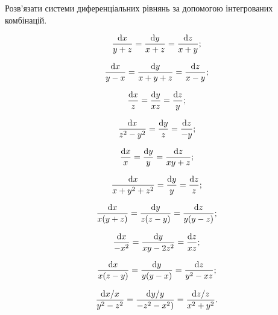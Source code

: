 Розв’язати системи диференціальних рівнянь за допомогою інтегрованих комбінацій.

\begin{multicols}{2}
\begin{problem}
	\[ \frac{\mathop{}\!\mathrm{d} x}{y + z} = \frac{\mathop{}\!\mathrm{d} y}{x + z} = \frac{\mathop{}\!\mathrm{d} z}{x + y}; \]
\end{problem}
\begin{problem}
	\[ \frac{\mathop{}\!\mathrm{d} x}{y - x} = \frac{\mathop{}\!\mathrm{d} y}{x + y + z} = \frac{\mathop{}\!\mathrm{d} z}{x - y}; \]
\end{problem}
\begin{problem}
	\[ \frac{\mathop{}\!\mathrm{d} x}{z} = \frac{\mathop{}\!\mathrm{d} y}{x z} = \frac{\mathop{}\!\mathrm{d} z}{y}; \]
\end{problem}
\begin{problem}
	\[ \frac{\mathop{}\!\mathrm{d} x}{z^2 - y^2} = \frac{\mathop{}\!\mathrm{d} y}{z} = \frac{\mathop{}\!\mathrm{d} z}{- y}; \]
\end{problem}
\begin{problem}
	\[ \frac{\mathop{}\!\mathrm{d} x}{x} = \frac{\mathop{}\!\mathrm{d} y}{y} = \frac{\mathop{}\!\mathrm{d} z}{x y + z}; \]
\end{problem}
\begin{problem}
	\[ \frac{\mathop{}\!\mathrm{d} x}{x + y^2 + z^2} = \frac{\mathop{}\!\mathrm{d} y}{y} = \frac{\mathop{}\!\mathrm{d} z}{z}; \]
\end{problem}
\begin{problem}
	\[ \frac{\mathop{}\!\mathrm{d} x}{x (y + z)} = \frac{\mathop{}\!\mathrm{d} y}{z (z - y)} = \frac{\mathop{}\!\mathrm{d} z}{y  (y - z)}; \]
\end{problem}
\begin{problem}
	\[ \frac{\mathop{}\!\mathrm{d} x}{-x^2} = \frac{\mathop{}\!\mathrm{d} y}{x y - 2 z^2} = \frac{\mathop{}\!\mathrm{d} z}{x z}; \]
\end{problem}
\begin{problem}
	\[ \frac{\mathop{}\!\mathrm{d} x}{x (z - y)} = \frac{\mathop{}\!\mathrm{d} y}{y (y - x)} = \frac{\mathop{}\!\mathrm{d} z}{y^2 - x z}; \]
\end{problem}
\begin{problem}
	\[ \frac{\mathop{}\!\mathrm{d} x / x}{y^2 - z^2} = \frac{\mathop{}\!\mathrm{d} y / y}{- z^2 - x^2)} = \frac{\mathop{}\!\mathrm{d} z / z}{x^2 + y^2}. \]
\end{problem}
\end{multicols}